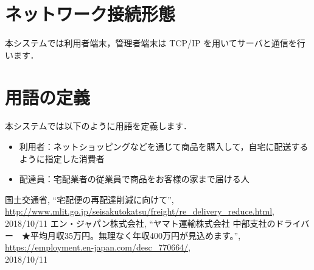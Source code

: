 \documentclass[a4j,titlepage]{jarticle}
\begin{document}
\section{ネットワーク接続形態}
本システムでは利用者端末，管理者端末は TCP/IP を用いてサーバと通信を行います．


\section{用語の定義}
本システムでは以下のように用語を定義します．
\begin{itemize}
 \item 利用者：ネットショッピングなどを通じて商品を購入して，自宅に配送するように指定した消費者
 \item 配達員：宅配業者の従業員で商品をお客様の家まで届ける人
\end{itemize}

\begin{thebibliography}{9}

国土交通省,
\newblock ``宅配便の再配達削減に向けて'',\\
\newblock \url{http://www.mlit.go.jp/seisakutokatsu/freight/re_delivery_reduce.html}, \\
2018/10/11
エン・ジャパン株式会社,
\newblock ``ヤマト運輸株式会社 中部支社のドライバー　★平均月収35万円。無理なく年収400万円が見込めます。'',\\
\newblock \url{https://employment.en-japan.com/desc_770664/}, \\
2018/10/11
\end{thebibliography}
\end{document}
